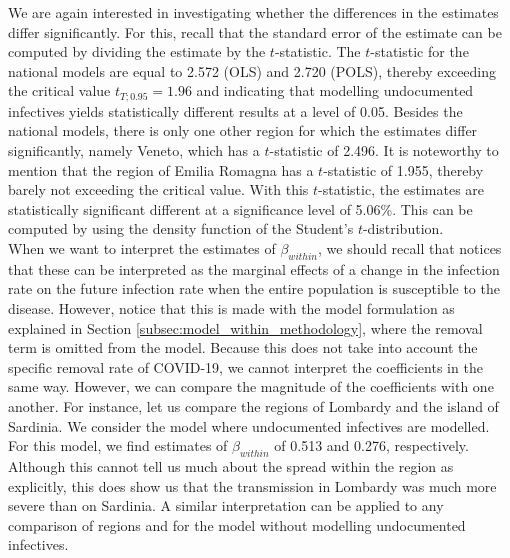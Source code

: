 \documentclass[12pt]{article}
\begin{document}
    We are again interested in investigating whether the differences in the estimates differ significantly. For this, recall that the standard error of the estimate can be computed by dividing the estimate by the $t$-statistic. The $t$-statistic for the national models are equal to 2.572 (OLS) and 2.720 (POLS), thereby exceeding the critical value $t_{T;0.95} = 1.96$ and indicating that modelling undocumented infectives yields statistically different results at a level of 0.05. Besides the national models, there is only one other region for which the estimates differ significantly, namely Veneto, which has a $t$-statistic of 2.496. It is noteworthy to mention that the region of Emilia Romagna has a $t$-statistic of 1.955, thereby barely not exceeding the critical value. With this $t$-statistic, the estimates are statistically significant different at a significance level of 5.06\%. This can be computed by using the density function of the Student's $t$-distribution. \\

    When we want to interpret the estimates of $\beta_{within}$, we should recall that \textcite{adda2016economic} notices that these can be interpreted as the marginal effects of a change in the infection rate on the future infection rate when the entire population is susceptible to the disease. However, notice that this is made with the model formulation as explained in Section \ref{subsec:model_within_methodology}, where the removal term is omitted from the model. Because this does not take into account the specific removal rate of COVID-19, we cannot interpret the coefficients in the same way. However, we can compare the magnitude of the coefficients with one another. For instance, let us compare the regions of Lombardy and the island of Sardinia. We consider the model where undocumented infectives are modelled. For this model, we find estimates of $\beta_{within}$ of 0.513 and 0.276, respectively. Although this cannot tell us much about the spread within the region as explicitly, this does show us that the transmission in Lombardy was much more severe than on Sardinia. A similar interpretation can be applied to any comparison of regions and for the model without modelling undocumented infectives. \\
\end{document}
